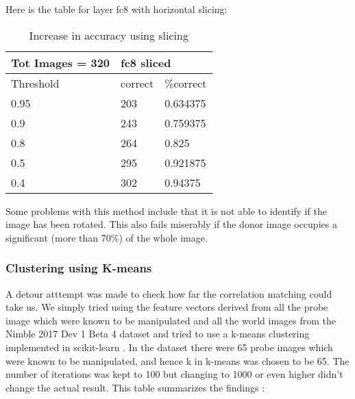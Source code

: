 \documentclass{article}
\begin{document}
Here is the table for layer fc8 with horizontal slicing:

\begin{table}[H]
\centering
\caption{Increase in accuracy using slicing}
\label{slicing}
\begin{tabular}{|l|l|l|}
  \hline
  Tot Images = 320 & \multicolumn{2}{|l|}{fc8 sliced} \\
  \hline
  Threshold        & correct       & \%correct      \\
  \hline
  0.95             & 203           & 0.634375       \\
  0.9              & 243           & 0.759375       \\
  0.8              & 264           & 0.825          \\
  0.5              & 295           & 0.921875       \\
  0.4              & 302           & 0.94375 \\
  \hline
\end{tabular}
\end{table}

Some problems with this method include that it is not able to identify if the image has been rotated. This also fails miserably if the donor image occupies a significant (more than 70\%) of the whole image.

\subsubsection{Clustering using K-means}
A detour atttempt was made to check how far the correlation matching could take us. We simply tried using the feature vectors derived from all the probe image which were known to be manipulated and all the world images from the Nimble 2017 Dev 1 Beta 4 dataset and tried to use a k-means clustering implemented in scikit-learn \cite{scikit-learn}. In the dataset there were 65 probe images which were known to be manipulated, and hence k in k-means was chosen to be 65. The number of iterations was kept to 100 but changing to 1000 or even higher didn't change the actual result. This table summarizes the findings :
\end{document}
